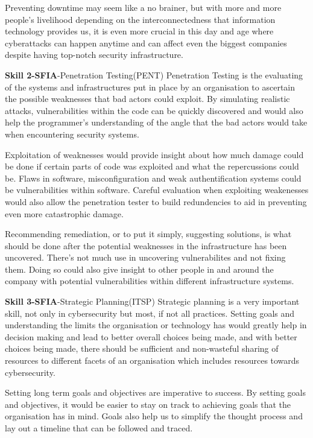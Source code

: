 \documentclass[a4paper, 11pt]{report}
\begin{document}
{Preventing downtime may seem like a no brainer, but with more and more people's livelihood depending on the interconnectedness that information technology provides us, it is even more crucial in this day and age where cyberattacks can happen anytime and can affect even the biggest companies despite having top-notch security infrastructure.

\textbf{Skill 2-SFIA}-Penetration Testing(PENT)\cite{}
Penetration Testing is the evaluating of the systems and infrastructures put in place by an organisation to ascertain the possible weaknesses that bad actors could exploit. By simulating realistic attacks, vulnerabilities within the code can be quickly discovered and would also help the programmer's understanding of the angle that the bad actors would take when encountering security systems.

Exploitation of weaknesses would provide insight about how much damage could be done if certain parts of code was exploited and what the repercussions could be. Flaws in software, misconfiguration and weak authentification systems could be vulnerabilities within software. Careful evaluation when exploiting weakenesses would also allow the penetration tester to build redundencies to aid in preventing even more catastrophic damage.

Recommending remediation, or to put it simply, suggesting solutions, is what should be done after the potential weaknesses in the infrastructure has been uncovered. There's not much use in uncovering vulnerabilites and not fixing them. Doing so could also give insight to other people in and around the company with potential vulnerabilities within different infrastructure systems.

\textbf{Skill 3-SFIA}-Strategic Planning(ITSP)\cite{}
Strategic planning is a very important skill, not only in cybersecurity but most, if not all practices. Setting goals and understanding the limits the organisation or technology has would greatly help in decision making and lead to better overall choices being made, and with better choices being made, there should be sufficient and non-wasteful sharing of resources to different facets of an organisation which includes resources towards cybersecurity.

Setting long term goals and objectives are imperative to success. By setting goals and objectives, it would be easier to stay on track to achieving goals that the organisation has in mind. Goals also help us to simplify the thought process and lay out a timeline that can be followed and traced. 

}
\end{document}
